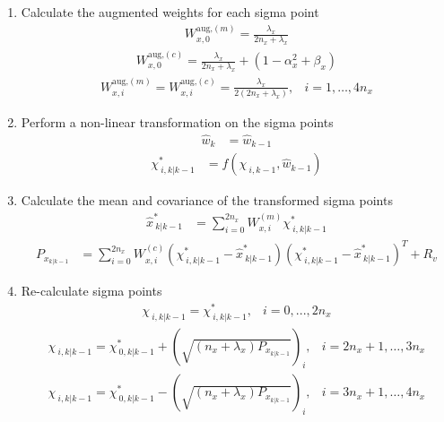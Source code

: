 \begin{enumerate}
    \item Calculate the augmented weights for each sigma point 
    \begin{align*}
        W^{\text{aug,}(m)}_{x,0} = \frac{\lambda_{x}}{2n_{x}+ \lambda_{x} } 
        \end{align*}
         \begin{align*}
        W^{\text{aug,}(c)}_{x,0} = \frac{\lambda_{x}}{2n_{x}+ \lambda_{x} } + (1 - \alpha^{2}_{x} + \beta_{x}) 
        \end{align*}
         \begin{align*}
        W^{\text{aug,}(m)}_{x,i} = W^{\text{aug,}(c)}_{x,i} = \frac{\lambda_{x}}{2(2n_{x}+ \lambda_{x}) }, &  i=1,\dots,4n_{x} 
    \end{align*}
    \item Perform a non-linear transformation on the sigma points
    \begin{align*}
        \hat{w}_{k} &= \hat{w}_{k-1} 
        \end{align*}
        \begin{align*}
        \chi^{*}_{\ i,k|k-1} &= f(\chi_{\ i,k-1},\hat{w}_{k-1})
    \end{align*}
    \item Calculate the mean and covariance of the transformed sigma points
    \begin{align*}
        \hat{x}^{*}_{\ k|k-1} &= \sum_{i=0}^{2n_{x}} W^{(m)}_{x,i} \chi^{*}_{\ i, k|k-1} 
        \end{align*}
        \begin{align*}
        P_{x_{k|k-1}} &=  \sum_{i=0}^{2n_{x}} W^{(c)}_{x,i} (\chi^{*}_{\ i, k|k-1} - \hat{x}^{*}_{\ k|k-1})(\chi^{*}_{\ i, k|k-1} - \hat{x}^{*}_{\ k|k-1})^{T} + R_{v} %
    \end{align*}
    \item Re-calculate sigma points
    \begin{align*}
        \chi_{\ i, k|k-1} = \chi^{*}_{\ i,k|k-1}, & i=0,...,2n_{x} 
         \end{align*}
         \begin{align*}
        \chi_{\ i, k|k-1} = \chi^{*}_{\ 0,k|k-1} + (\sqrt{(n_{x}+\lambda_{x})P_{x_{k|k-1}}})_{i},  & i=2n_{x}+1,\dots,3n_{x} 
         \end{align*}
         \begin{align*}
        \chi_{\ i, k|k-1} = \chi^{*}_{\ 0,k|k-1} - (\sqrt{(n_{x}+\lambda_{x})P_{x_{k|k-1}}})_{i}, &  i=3n_{x}+1,\dots,4n_{x}

\end{align*}
\end{enumerate}
